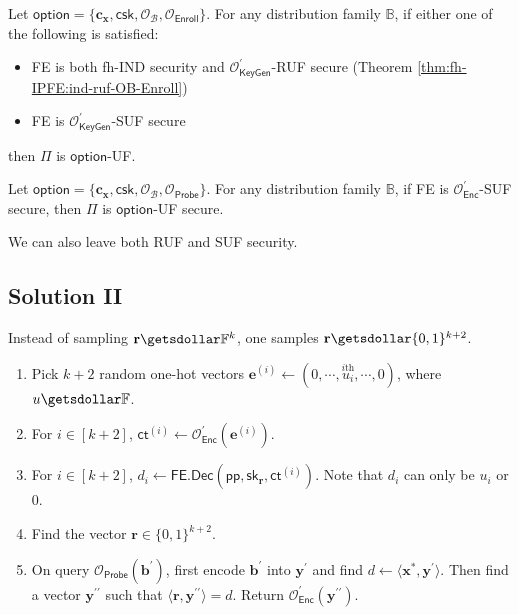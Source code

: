 \begin{theorem}
	Let $\textsf{option} = \{ \mathbf{c_x}, \textsf{csk}, \mathcal{O}_\mathcal{B}, \mathcal{O}_{\textsf{Enroll}} \}$. For any distribution family $\mathbb{B}$, if either one of the following is satisfied:
	\begin{itemize}
		\item \textsf{FE} is both fh-IND security and $\mathcal{O}^\prime_{\textsf{KeyGen}}$-RUF secure (Theorem \ref{thm:fh-IPFE:ind-ruf-OB-Enroll})
		\item \textsf{FE} is $\mathcal{O}^\prime_{\textsf{KeyGen}}$-SUF secure
	\end{itemize}
then $\Pi$ is $\textsf{option}$-UF. 
\end{theorem}

\begin{theorem}
	Let $\textsf{option} = \{ \mathbf{c_x}, \textsf{csk}, \mathcal{O}_\mathcal{B}, \mathcal{O}_{\textsf{Probe}} \}$. For any distribution family $\mathbb{B}$, if \textsf{FE} is $\mathcal{O}^\prime_{\textsf{Enc}}$-SUF secure, then $\Pi$ is $\textsf{option}$-UF secure. 
\end{theorem}

We can also leave both RUF and SUF security.

\subsection{Solution II}

Instead of sampling $\mathbf{r} \getsdollar \mathbb{F}^{k}$, one samples $\mathbf{r} \getsdollar \{0, 1\}^{k+2}$.
\begin{enumerate}

	\item Pick $k+2$ random one-hot vectors $\mathbf{e}^{(i)} \gets (0, \cdots, \overset{i\text{th}}{u_i}, \cdots, 0)$, where $u \getsdollar \mathbb{F}$.

	\item For $i \in [k+2]$, $\textsf{ct}^{(i)} \gets \mathcal{O}^\prime_{\textsf{Enc}}(\mathbf{e}^{(i)})$.

	\item For $i \in [k+2]$, $d_i \gets \textsf{FE.Dec}(\textsf{pp}, \textsf{sk}_{\mathbf{r}}, \textsf{ct}^{(i)})$. Note that $d_i$ can only be $u_i$ or $0$.

	\item Find the vector $\mathbf{r} \in \{0, 1\}^{k+2}$.

	\item On query $\mathcal{O}_{\textsf{Probe}}(\mathbf{b}^\prime)$, first encode $\mathbf{b}^\prime$ into $\mathbf{y}^\prime$ and find $d \gets \langle \mathbf{x}^{*}, {\mathbf{y}^\prime} \rangle$. Then find a vector $\mathbf{y}^{\prime\prime}$ such that $\langle \mathbf{r}, {\mathbf{y}^{\prime\prime}} \rangle = d$. Return $\mathcal{O}^\prime_{\textsf{Enc}}(\mathbf{y}^{\prime\prime})$.

\end{enumerate}


